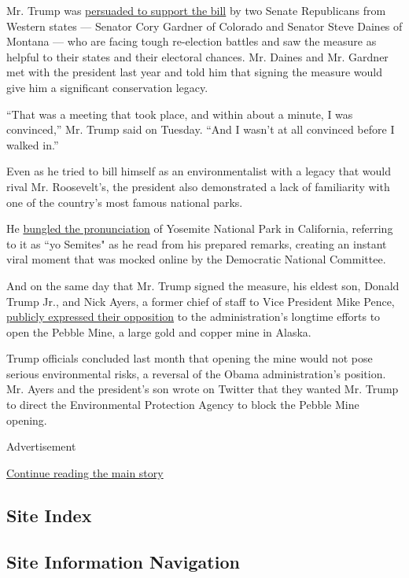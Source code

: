 Mr. Trump was
\href{https://www.nytimes.com/2020/07/22/us/politics/land-water-conservation-fund.html}{persuaded
to support the bill} by two Senate Republicans from Western states ---
Senator Cory Gardner of Colorado and Senator Steve Daines of Montana ---
who are facing tough re-election battles and saw the measure as helpful
to their states and their electoral chances. Mr. Daines and Mr. Gardner
met with the president last year and told him that signing the measure
would give him a significant conservation legacy.

``That was a meeting that took place, and within about a minute, I was
convinced,'' Mr. Trump said on Tuesday. ``And I wasn't at all convinced
before I walked in.''

Even as he tried to bill himself as an environmentalist with a legacy
that would rival Mr. Roosevelt's, the president also demonstrated a lack
of familiarity with one of the country's most famous national parks.

He
\href{https://www.nytimes.com/video/us/100000007272140/trump-stumbles-over-yosemite.html}{bungled
the pronunciation} of Yosemite National Park in California, referring to
it as ``yo Semites" as he read from his prepared remarks, creating an
instant viral moment that was mocked online by the Democratic National
Committee.

And on the same day that Mr. Trump signed the measure, his eldest son,
Donald Trump Jr., and Nick Ayers, a former chief of staff to Vice
President Mike Pence,
\href{https://twitter.com/DonaldJTrumpJr/status/1290723762523045888}{publicly
expressed their opposition} to the administration's longtime efforts to
open the Pebble Mine, a large gold and copper mine in Alaska.

Trump officials concluded last month that opening the mine would not
pose serious environmental risks, a reversal of the Obama
administration's position. Mr. Ayers and the president's son wrote on
Twitter that they wanted Mr. Trump to direct the Environmental
Protection Agency to block the Pebble Mine opening.

Advertisement

\protect\hyperlink{after-bottom}{Continue reading the main story}

\hypertarget{site-index}{%
\subsection{Site Index}\label{site-index}}

\hypertarget{site-information-navigation}{%
\subsection{Site Information
Navigation}\label{site-information-navigation}}


